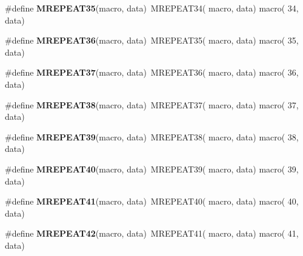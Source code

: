 \begin{DoxyCompactItemize}
\item 
\hypertarget{group__group__xmega__utils__mrepeat_ga20ad71ff8aba1011aa0cb4cf86669f73}{\#define {\bfseries M\-R\-E\-P\-E\-A\-T35}(macro, data)~M\-R\-E\-P\-E\-A\-T34( macro, data)   macro( 34, data)}\label{group__group__xmega__utils__mrepeat_ga20ad71ff8aba1011aa0cb4cf86669f73}

\item 
\hypertarget{group__group__xmega__utils__mrepeat_gad01671ded2811e1cabe5d5642ebb4987}{\#define {\bfseries M\-R\-E\-P\-E\-A\-T36}(macro, data)~M\-R\-E\-P\-E\-A\-T35( macro, data)   macro( 35, data)}\label{group__group__xmega__utils__mrepeat_gad01671ded2811e1cabe5d5642ebb4987}

\item 
\hypertarget{group__group__xmega__utils__mrepeat_ga82184cd9b81480efe7d23bb1bd035645}{\#define {\bfseries M\-R\-E\-P\-E\-A\-T37}(macro, data)~M\-R\-E\-P\-E\-A\-T36( macro, data)   macro( 36, data)}\label{group__group__xmega__utils__mrepeat_ga82184cd9b81480efe7d23bb1bd035645}

\item 
\hypertarget{group__group__xmega__utils__mrepeat_ga809e564faa3a2869dbe184488e37a7b2}{\#define {\bfseries M\-R\-E\-P\-E\-A\-T38}(macro, data)~M\-R\-E\-P\-E\-A\-T37( macro, data)   macro( 37, data)}\label{group__group__xmega__utils__mrepeat_ga809e564faa3a2869dbe184488e37a7b2}

\item 
\hypertarget{group__group__xmega__utils__mrepeat_ga8940da677b29febf21ca13b7c42d97a2}{\#define {\bfseries M\-R\-E\-P\-E\-A\-T39}(macro, data)~M\-R\-E\-P\-E\-A\-T38( macro, data)   macro( 38, data)}\label{group__group__xmega__utils__mrepeat_ga8940da677b29febf21ca13b7c42d97a2}

\item 
\hypertarget{group__group__xmega__utils__mrepeat_ga38c6ce54b5de528a63b8cb4298e57493}{\#define {\bfseries M\-R\-E\-P\-E\-A\-T40}(macro, data)~M\-R\-E\-P\-E\-A\-T39( macro, data)   macro( 39, data)}\label{group__group__xmega__utils__mrepeat_ga38c6ce54b5de528a63b8cb4298e57493}

\item 
\hypertarget{group__group__xmega__utils__mrepeat_ga1c029ee082fe728ca07ac8fb71fbe4d9}{\#define {\bfseries M\-R\-E\-P\-E\-A\-T41}(macro, data)~M\-R\-E\-P\-E\-A\-T40( macro, data)   macro( 40, data)}\label{group__group__xmega__utils__mrepeat_ga1c029ee082fe728ca07ac8fb71fbe4d9}

\item 
\hypertarget{group__group__xmega__utils__mrepeat_gab6109bc5321c78307694174520c00217}{\#define {\bfseries M\-R\-E\-P\-E\-A\-T42}(macro, data)~M\-R\-E\-P\-E\-A\-T41( macro, data)   macro( 41, data)}\label{group__group__xmega__utils__mrepeat_gab6109bc5321c78307694174520c00217}


\end{DoxyCompactItemize}
